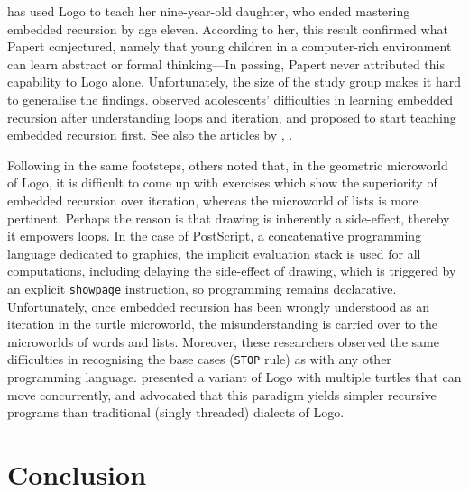 \documentclass[11pt,a4paper]{article}
\newcommand\plang[1]{\textsf{#1}\xspace}
\newcommand\exc[1]{\texttt{\small #1}}
\begin{document}
\textcite{McDougall:1985} \citeyearpar{McDougall:1988}
\citeyearpar{McDougall:1989} \citeyearpar{McDougall:1990a}
\citeyearpar{McDougall:1990b} \citeyearpar{McDougall:1991} has used
\plang{Logo} to teach her nine\hyp{}year\hyp{}old daughter, who ended
mastering embedded recursion by age eleven. According to her, this
result confirmed what Papert conjectured, namely that young children
in a computer\hyp{}rich environment can learn abstract or formal
thinking---In passing, Papert never attributed this capability to
\plang{Logo} alone. Unfortunately, the size of the study group makes
it hard to generalise the findings. \textcite{Rouchier:1986a}
\citeyearpar{Rouchier:1986b} \citeyearpar{Rouchier:1987} observed
adolescents' difficulties in learning embedded recursion after
understanding loops and iteration, and proposed to start teaching
embedded recursion first. See also the articles by
\textcite{Barfurth:1987}, \textcite{BarfurthRetschitzki:1987}.

Following in the same footsteps, others
\citep{GobetNunezRetschitzki:1989,RetschitzkiGobetNunez:1989,GurtnerGexGobetNunez:1990,RetschitzkiGexGobetGurtnerNunez:1991}
noted that, in the geometric microworld of \plang{Logo}, it is
difficult to come up with exercises which show the superiority of
embedded recursion over iteration, whereas the microworld of lists is
more pertinent. Perhaps the reason is that drawing is inherently a
side\hyp{}effect, thereby it empowers loops. In the case of
\plang{PostScript}, a concatenative programming language dedicated to
graphics, the implicit evaluation stack is used for all computations,
including delaying the side\hyp{}effect of drawing, which is triggered
by an explicit \exc{showpage} instruction, so programming remains
declarative. Unfortunately, once embedded recursion has been wrongly
understood as an iteration in the turtle microworld, the
misunderstanding is carried over to the microworlds of words and
lists. Moreover, these researchers observed the same difficulties in
recognising the base cases (\exc{STOP} rule) as with any other
programming language. \textcite{Giveon:1991} presented a variant of
\plang{Logo} with multiple turtles that can move concurrently, and
advocated that this paradigm yields simpler recursive programs than
traditional (singly threaded) dialects of \plang{Logo}.

\section*{Conclusion}
\end{document}
